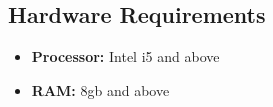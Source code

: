 \subsection{Hardware Requirements}
\begin{itemize}
    \item \textbf{Processor:} Intel i5 and above
    \item \textbf{RAM:} 8gb and above
\end{itemize}





















